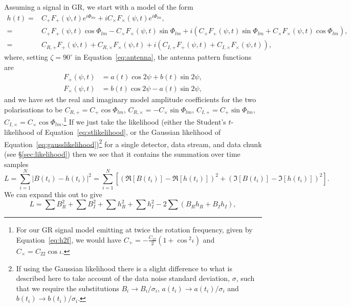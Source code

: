 Assuming a signal in GR, we start with a model of the form
\begin{align}\label{eq:appmodel}
h(t) =& C_+ F_+(\psi,t)e^{i\Phi_{lm}} + iC_{\times}F_{\times}(\psi,t)e^{i\Phi_{lm}}, \nonumber \\
=& C_+ F_+(\psi,t)\cos{\Phi_{lm}} - C_{\times}F_{\times}(\psi,t)\sin{\Phi_{lm}} + i\left(C_+ F_+(\psi,t)\sin{\Phi_{lm}}+ C_{\times}F_{\times}(\psi,t)\cos{\Phi_{lm}} \right), \nonumber \\
=& C_{R,+}F_+(\psi,t) + C_{R,\times}F_{\times}(\psi,t) + i\left(C_{I,+}F_+(\psi,t) + C_{I,\times}F_{\times}(\psi,t) \right),
\end{align}
where, setting $\zeta = 90^{\circ}$ in Equation~\ref{eq:antenna}, the antenna pattern functions are
\begin{align}\label{eq:antennanew}
F_+(\psi,t) &=a(t)\cos{2\psi} + b(t)\sin{2\psi}, \nonumber \\
F_{\times}(\psi,t) &= b(t)\cos{2\psi} - a(t)\sin{2\psi},
\end{align}
and we have set the real and imaginary model amplitude coefficients for the two polarisations to be $C_{R,+} =
C_+\cos{\Phi_{lm}}$, $C_{R,\times} = -C_{\times}\sin{\Phi_{lm}}$, $C_{I,+} =
C_+\sin{\Phi_{lm}}$, $C_{I,\times} = C_{\times}\cos{\Phi_{lm}}$.\footnote{For our GR signal model emitting at twice
the rotation frequency, given by Equation~\ref{eq:h2f}, we would have $C_+ = -\frac{C_{22}}{2}\left(1+\cos{}^2{\iota}\right)$ and $C_{\times} = C_{22}\cos{\iota}$.}
If we just take the likelihood (either the Student's $t$-likelihood of Equation~\ref{eq:stlikelihood}, or the
Gaussian likelihood of Equation~\ref{eq:gausslikelihood})\footnote{If using the Gaussian likelihood there is a slight difference to what is 
described here to take account of the data noise standard deviation, $\sigma$, 
such that we require the substitutions $B_i \rightarrow B_i/\sigma_i$, $a(t_i) \rightarrow a(t_i)/\sigma_i$ and $b(t_i) \rightarrow b(t_i)/\sigma_i$.} for a single detector,
data stream, and data chunk (see \S\ref{sec:likelihood}) then we see that it contains the summation over time samples
\begin{equation}
L = \sum_{i=1}^N \left|B(t_i) - h(t_i)\right|^2 = \sum_{i=1}^N \left[ \left(\Re{[B(t_i)]} - \Re{[h(t_i)]}\right)^2 + \left(\Im{[B(t_i)]} - \Im{[h(t_i)]}\right)^2 \right].
\end{equation}
We can expand this out to give
\begin{equation}\label{eq:likepart}
L = \sum B_R^2 + \sum B_I^2 + \sum h_R^2 + \sum h_I^2 - 2\sum\left(B_R h_R + B_I h_I \right),
\end{equation}
